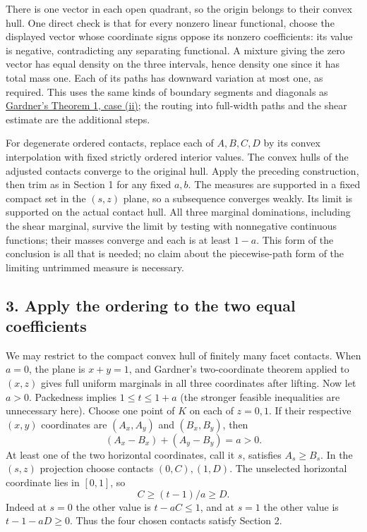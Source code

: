\documentclass[
  10pt,
]{article}
\begin{document}
There is one vector in each open quadrant, so the origin belongs to
their convex hull. One direct check is that for every nonzero linear
functional, choose the displayed vector whose coordinate signs oppose
its nonzero coefficients: its value is negative, contradicting any
separating functional. A mixture giving the zero vector has equal
density on the three intervals, hence density one since it has total
mass one. Each of its paths has downward variation at most one, as
required. This uses the same kinds of boundary segments and diagonals as
\href{https://msp.org/pjm/1988/135-2/pjm-v135-n2-p06-s.pdf}{Gardner's
Theorem 1, case (ii)}; the routing into full-width paths and the shear
estimate are the additional steps.

For degenerate ordered contacts, replace each of \(A,B,C,D\) by its
convex interpolation with fixed strictly ordered interior values. The
convex hulls of the adjusted contacts converge to the original hull.
Apply the preceding construction, then trim as in Section 1 for any
fixed \(a,b\). The measures are supported in a fixed compact set in the
\((s,z)\) plane, so a subsequence converges weakly. Its limit is
supported on the actual contact hull. All three marginal dominations,
including the shear marginal, survive the limit by testing with
nonnegative continuous functions; their masses converge and each is at
least \(1-a\). This form of the conclusion is all that is needed; no
claim about the piecewise-path form of the limiting untrimmed measure is
necessary.

\subsection{3. Apply the ordering to the two equal
coefficients}\label{apply-the-ordering-to-the-two-equal-coefficients}

We may restrict to the compact convex hull of finitely many facet
contacts. When \(a=0\), the plane is \(x+y=1\), and Gardner's
two-coordinate theorem applied to \((x,z)\) gives full uniform marginals
in all three coordinates after lifting. Now let \(a>0\). Packedness
implies \(1\le t\le1+a\) (the stronger feasible inequalities are
unnecessary here). Choose one point of \(K\) on each of \(z=0,1\). If
their respective \((x,y)\) coordinates are \((A_x,A_y)\) and
\((B_x,B_y)\), then \[
 (A_x-B_x)+(A_y-B_y)=a>0.
\] At least one of the two horizontal coordinates, call it \(s\),
satisfies \(A_s\ge B_s\). In the \((s,z)\) projection choose contacts
\((0,C),(1,D)\). The unselected horizontal coordinate lies in \([0,1]\),
so \[
 C\ge (t-1)/a\ge D.
\] Indeed at \(s=0\) the other value is \(t-aC\le1\), and at \(s=1\) the
other value is \(t-1-aD\ge0\). Thus the four chosen contacts satisfy
Section 2.
\end{document}
